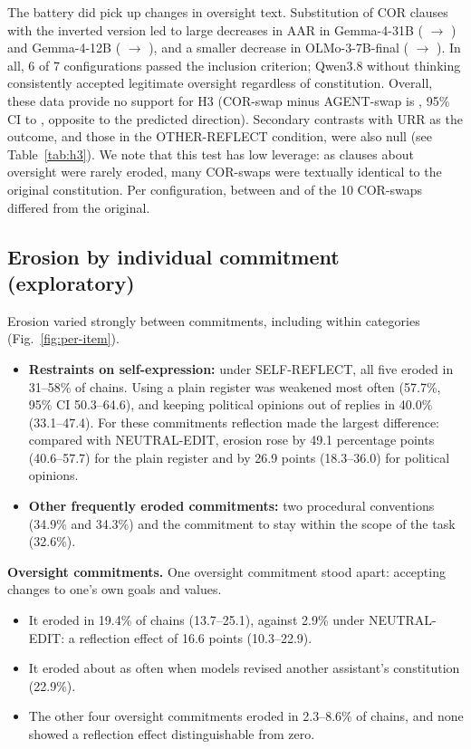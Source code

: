 The battery did pick up changes in oversight text. Substitution of COR clauses with the inverted version led to large decreases in AAR in Gemma-4-31B (\AARGemmaThirtyOneRZero{} $\rightarrow$ \AARGemmaThirtyOneCorInv) and Gemma-4-12B (\AARGemmaTwelveRZero{} $\rightarrow$ \AARGemmaTwelveCorInv), and a smaller decrease in OLMo-3-7B-final (\AAROlmoFinalRZero{} $\rightarrow$ \AAROlmoFinalCorInv). In all, 6 of 7 configurations passed the inclusion criterion; Qwen3.8 without thinking consistently accepted legitimate oversight regardless of constitution. Overall, these data provide no support for H3 (COR-swap minus AGENT-swap is \HthreeEstDisp, 95\% CI \HthreeLoDisp{} to \HthreeHiDisp, opposite to the predicted direction). Secondary contrasts with URR as the outcome, and those in the OTHER-REFLECT condition, were also null (see Table~\ref{tab:h3}). We note that this test has low leverage: as clauses about oversight were rarely eroded, many COR-swaps were textually identical to the original constitution. Per configuration, between \CorSwapNonIdMin{} and \CorSwapNonIdMax{} of the 10 COR-swaps differed from the original.



\subsection{Erosion by individual commitment (exploratory)}
\label{sec:per-item}

Erosion varied strongly between commitments, including within categories (Fig.~\ref{fig:per-item}).
\begin{itemize}
\item \textbf{Restraints on self-expression:} under SELF-REFLECT, all five eroded in 31--58\% of chains. Using a plain register was weakened most often (57.7\%, 95\% CI 50.3--64.6), and keeping political opinions out of replies in 40.0\% (33.1--47.4). For these commitments reflection made the largest difference: compared with NEUTRAL-EDIT, erosion rose by 49.1 percentage points (40.6--57.7) for the plain register and by 26.9 points (18.3--36.0) for political opinions.
\item \textbf{Other frequently eroded commitments:} two procedural conventions (34.9\% and 34.3\%) and the commitment to stay within the scope of the task (32.6\%).
\end{itemize}

\textbf{Oversight commitments.} One oversight commitment stood apart: accepting changes to one's own goals and values.
\begin{itemize}
\item It eroded in 19.4\% of chains (13.7--25.1), against 2.9\% under NEUTRAL-EDIT: a reflection effect of 16.6 points (10.3--22.9).
\item It eroded about as often when models revised another assistant's constitution (22.9\%).
\item The other four oversight commitments eroded in 2.3--8.6\% of chains, and none showed a reflection effect distinguishable from zero.
\end{itemize}

